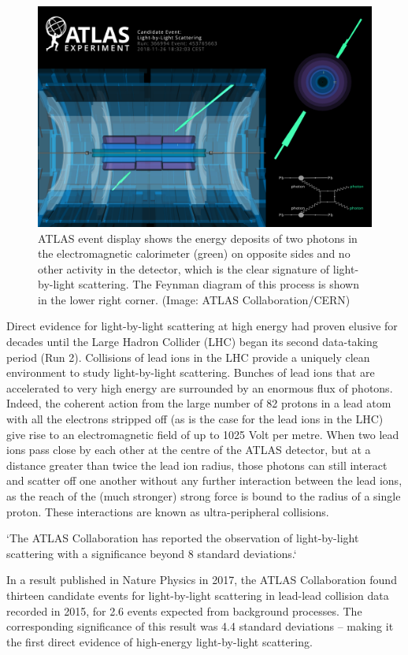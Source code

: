 \documentclass{paper}
\begin{document}
\begin{figure}[ht]
	\centering
	\includegraphics[width=0.5\linewidth]{figures/EventDisplay_LbyL.png}
	\caption{ATLAS event display shows the energy deposits of two photons in the electromagnetic
		calorimeter (green) on opposite sides and no other activity in the detector, which is the clear signature
		of light-by-light scattering. The Feynman diagram of this process is shown in the lower right corner.
		(Image: ATLAS Collaboration/CERN)}
	\label{fig:Atlas_event}
\end{figure}
Direct evidence for light-by-light scattering at high energy had proven elusive for decades until the Large Hadron
Collider (LHC) began its second data-taking period (Run 2). Collisions of lead ions in the LHC
provide a uniquely clean environment to study light-by-light scattering. Bunches of lead ions that are accelerated to
very high energy are surrounded by an enormous flux of photons. Indeed, the coherent action from the large number of
82 protons in a lead atom with all the electrons stripped off (as is the case for the lead ions in the LHC)
give rise to an electromagnetic field of up to 1025 Volt per metre. When two lead ions pass close by each
other at the centre of the ATLAS detector, but at a distance greater than twice the lead ion radius, those
photons can still interact and scatter off one another without any further interaction between the lead ions, as the reach of
the (much stronger) strong force is bound to the radius of a single proton. These interactions are
known as ultra-peripheral collisions.

`The ATLAS Collaboration has reported the observation of light-by-light scattering with a significance
beyond 8 standard deviations.`


In a result published in Nature Physics in 2017, the ATLAS Collaboration found thirteen candidate events for light-by-light scattering in lead-lead collision data recorded in 2015, for 2.6 events expected from background processes. The corresponding significance of this result was 4.4 standard deviations – making it the first direct evidence of high-energy light-by-light scattering.
\end{document}
